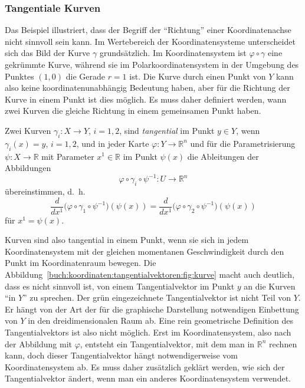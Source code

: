 %
%
\subsubsection{Tangentiale Kurven}
Das Beispiel illustriert, dass der Begriff der ``Richtung'' einer
Koordinatenachse nicht sinnvoll sein kann.
Im Wertebereich der Koordinatensysteme unterscheidet sich das Bild
der Kurve $\gamma$ grundsätzlich.
Im Koordinatensystem ist $\varphi\circ\gamma$ eine gekrümmte Kurve,
während sie im Polarkoordinatensystem in der Umgebung des Punktes
$(1,0)$ die Gerade $r=1$ ist.
Die Kurve durch einen Punkt von $Y$ kann also keine koordinatenunabhängig
Bedeutung haben, aber für die Richtung der Kurve in einem Punkt ist
dies möglich.
Es muss daher definiert werden, wann zwei Kurven die gleiche Richtung
in einem gemeinsamen Punkt haben.


%

\begin{definition}
%
Zwei Kurven $\gamma_i\colon X\to Y$, $i=1,2$, sind
{\em tangential} im Punkt $y\in Y$, wenn
$\gamma_i(x) = y$, $i=1,2$, und
in jeder Karte
$\varphi\colon Y\to\mathbb{R}^n$ und für die Parametrisierung
$\psi\colon X\to \mathbb{R}$ mit Parameter $x^1\in\mathbb{R}$ 
im Punkt $\psi(x)$ die Ableitungen der Abbildungen
\[
\varphi
\circ
\gamma_i
\circ
\psi^{-1}
\colon
U\to\mathbb{R}^n
\]
übereinstimmen, d.~h.
\begin{equation}
\frac{d}{dx^1}
\bigl(\varphi\circ\gamma_1\circ\psi^{-1}\bigr)(\psi(x))
=
\frac{d}{dx^1}
\bigl(\varphi\circ\gamma_2\circ\psi^{-1}\bigr)(\psi(x))
\label{buch:koordinaten:tangentialvektoren:eqn:tangential}
\end{equation}
für $x^1=\psi(x)$.
\end{definition}

Kurven sind also tangential in einem Punkt, wenn sie sich in jedem
Koordinatensystem mit der gleichen momentanen Geschwindigkeit
%
durch den Punkt im Koordinatenraum bewegen.
Die Abbildung~\ref{buch:koordinaten:tangentialvektoren:fig:kurve}
macht auch deutlich, dass es nicht sinnvoll ist, von einem
Tangentialvektor im Punkt $y$ an die Kurven ``in $Y$'' zu sprechen.
Der grün eingezeichnete Tangentialvektor ist nicht Teil von $Y$.
Er hängt von der Art der für die graphische Darstellung notwendigen
Einbettung von $Y$ in den dreidimensionalen Raum ab.
Eine rein geometrische Definition des Tangentialvektors ist also
nicht möglich.
Erst im Koordinatensystem, also nach der Abbildung mit $\varphi$,
entsteht ein Tangentialvektor, mit dem man in $\mathbb{R}^n$
rechnen kann, doch dieser Tangentialvektor hängt notwendigerweise
vom Koordinatensystem ab.
Es muss daher zusätzlich geklärt werden, wie sich der Tangentialvektor
ändert, wenn man ein anderes Koordinatensystem verwendet.

